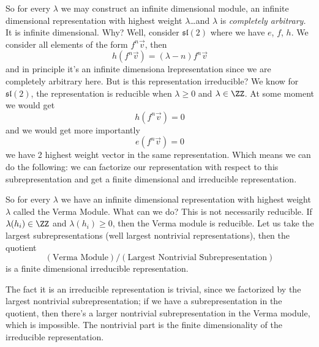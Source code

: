 So for every $\lambda$ we may construct an infinite dimensional
module, an infinite dimensional representation with highest
weight $\lambda$\dots and $\lambda$ is \emph{completely arbitrary.}
It is infinite dimensional. Why? Well, consider
$\mathfrak{sl}(2)$ where we have $e$, $f$, $h$. We consider all
elements of the form $f^{n}\vec{v}$, then
\begin{equation}
h(f^{n}\vec{v})=(\lambda-n)f^{n}\vec{v}
\end{equation}
and in principle it's an infinite dimensiona lrepresentation
since we are completely arbitrary here. But is this
representation irreducible? We know for $\mathfrak{sl}(2)$, the
representation is reducible when $\lambda\geq0$ and
$\lambda\in\ZZ$. At some moment we would get
\begin{equation}
h(f^{n}\vec{v})=0
\end{equation}
and we would get more importantly
\begin{equation}
e(f^{n}\vec{v})=0
\end{equation}
we have 2 highest weight vector in the same representation. Which
means we can do the following: we can factorize our
representation with respect to this subrepresentation and get a
finite dimensional and irreducible representation.

So for every $\lambda$ we have an infinite dimensional
representation with highest weight $\lambda$ called the Verma
Module. What can we do? This is not necessarily reducible. If
$\lambda(h_{i})\in\ZZ$ and $\lambda(h_{i})\geq0$, then the Verma
module is reducible. Let us take the largest subrepresentations
(well largest nontrivial representations), then the quotient
\begin{equation}
(\mbox{Verma Module})/(\mbox{Largest Nontrivial Subrepresentation})
\end{equation}
is a finite dimensional irreducible representation.

The fact it is an irreducible representation is trivial, since we
factorized by the largest nontrivial subrepresentation; if we
have a subrepresentation in the quotient, then there's a larger
nontrivial subrepresentation in the Verma module, which is
impossible. The nontrivial part is the finite dimensionality of
the irreducible representation.
